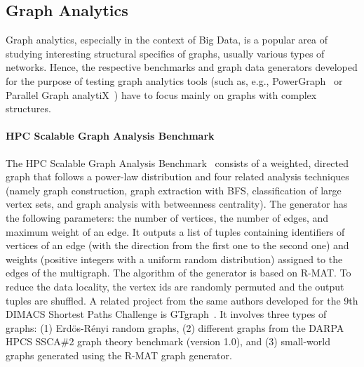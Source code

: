 \subsection{Graph Analytics}
\label{sec:generators_analytics}

Graph analytics, especially in the context of Big Data, is a popular area of studying interesting structural specifics of graphs, usually various types of networks.  Hence, the respective benchmarks and graph data generators developed for the purpose of testing graph analytics tools (such as, e.g.,  PowerGraph~\cite{Gonzalez:2012:PDG:2387880.2387883} or Parallel Graph analytiX~\cite{Sevenich:2016:UDL:3007263.3007265}) have to focus mainly on graphs with complex structures.

\paragraph{HPC Scalable Graph Analysis Benchmark} The HPC Scalable Graph
Analysis Benchmark~\cite{HPCgraph,Bader:2005:DIH:2099301.2099360} consists of a
weighted, directed graph that follows a power-law distribution and four related
analysis techniques (namely graph construction, graph extraction with BFS,
                     classification of large vertex sets, and graph analysis
                     with betweenness centrality). The generator has the
following parameters: the number of vertices, the number of edges, and maximum weight of
an edge. It outputs a list of tuples containing identifiers of vertices of an
edge (with the direction from the first one to the second one) and weights
(positive integers  with a uniform random distribution) assigned to the edges of
the multigraph.  The algorithm of the generator is based on R-MAT. To reduce the data
locality, the vertex ids are randomly permuted and the output
tuples are shuffled. A related project from the same authors
developed for the 9th DIMACS Shortest Paths Challenge is GTgraph~\cite{GTgraph}.
It involves three types of graphs: (1) Erd\"{o}s-R\'{e}nyi random graphs, (2)
different graphs from the DARPA HPCS SSCA\#2 graph theory benchmark
(version 1.0), and (3) small-world graphs generated using the R-MAT graph
generator.

